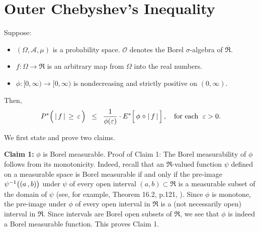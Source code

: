 

\section{Outer Chebyshev's Inequality}
\setcounter{theorem}{0}
\setcounter{equation}{0}


\renewcommand{\theenumi}{\roman{enumi}}
\renewcommand{\labelenumi}{\textnormal{(\theenumi)}$\;\;$}


\begin{theorem}
\mbox{}\vskip 0.1cm
\noindent
Suppose:
\begin{itemize}
\item
	$(\Omega,\mathcal{A},\mu)$ is a probability space.
	$\mathcal{O}$ denotes the Borel $\sigma$-algebra of $\overline{\Re}$.
\item
	$f : \Omega \longrightarrow \Re$ is an arbitrary map from $\Omega$ into the real numbers.
\item
	$\phi : [0,\infty) \longrightarrow [0,\infty)$ is nondecreasing and strictly positive on $(0,\infty)$.
\end{itemize}
Then,
\begin{equation*}
P^{*}\!\left(\,\vert\,\overset{{\color{white}.}}{f}\,\vert\,\geq\,\varepsilon\,\right)
\;\;\leq\;\;
	\dfrac{1}{\phi(\varepsilon)} \cdot E^{*}\!\left[\,\phi\overset{{\color{white}-}}{\circ}\vert\,f\,\vert\,\right],
	\quad
	\textnormal{for each \;$\varepsilon > 0$}.
\end{equation*}
\end{theorem}
\proof
We first state and prove two claims.

\vskip 0.5cm
\noindent
\textbf{Claim 1:}\;\; $\phi$ is Borel measurable.
\vskip 0.1cm
\noindent
Proof of Claim 1: The Borel measurability of $\phi$ follows from its monotonicity.
Indeed, recall that an $\Re$-valued function $\psi$ defined on a measurable space is Borel measurable
if and only if
the pre-image $\psi^{-1}\!\left((a\overset{{\color{white}-}}{,}b)\right)$ under $\psi$ of every open interval
$(a,b)\subset\Re$ is a measurable subset of the domain of $\psi$
(see, for example, Theorem 16.2, p.121, \cite{Aliprantis1998}).
Since $\phi$ is monotone, the pre-image under $\phi$ of every open interval in $\Re$ is a
(not necessarily open) interval in $\Re$.
Since intervals are Borel open subsets of $\Re$, we see that $\phi$ is indeed a Borel measurable function.
This proves Claim 1.

